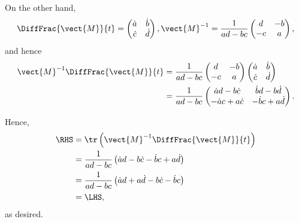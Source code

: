 \begin{enumerate}
          On the other hand,
          \[
              \DiffFrac{\vect{M}}{t} = \begin{pmatrix}
                  \dot{a} & \dot{b} \\ \dot{c} & \dot{d}
              \end{pmatrix},
              \vect{M}^{-1} = \frac{1}{ad - bc} \begin{pmatrix}
                  d & -b \\ -c & a
              \end{pmatrix},
          \]
          and hence
          \begin{align*}
              \vect{M}^{-1} \DiffFrac{\vect{M}}{t} & = \frac{1}{ad - bc} \begin{pmatrix}
                                                                             d & -b \\ -c & a
                                                                         \end{pmatrix} \begin{pmatrix}
                                                                                           \dot{a} & \dot{b} \\ \dot{c} & \dot{d}
                                                                                       \end{pmatrix}                                         \\
                                                   & = \frac{1}{ad - bc} \begin{pmatrix}
                                                                             \dot{a} d - b \dot{c} & \dot{b} d - b \dot{d} \\ -\dot{a}c + a\dot{c} & -\dot{b}c + a\dot{d}
                                                                         \end{pmatrix}.
          \end{align*}

          Hence,
          \begin{align*}
              \RHS & = \tr \left(\vect{M}^{-1} \DiffFrac{\vect{M}}{t}\right)                        \\
                   & = \frac{1}{ad - bc} \left(\dot{a} d - b \dot{c} - \dot{b} c + a\dot{d}\right)  \\
                   & = \frac{1}{ad - bc} \left(\dot{a} d + a \dot{d} - b \dot{c} - \dot{b} c\right) \\
                   & = \LHS,
          \end{align*}
          as desired.


\end{enumerate}
